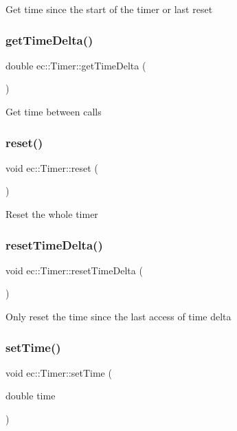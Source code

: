 Get time since the start of the timer or last reset \mbox{\label{classec_1_1_timer_a17b6b8d3cf83bb86df9164160b791016}} 
\subsubsection{\texorpdfstring{get\+Time\+Delta()}{getTimeDelta()}}
{\footnotesize\ttfamily double ec\+::\+Timer\+::get\+Time\+Delta (\begin{DoxyParamCaption}{ }\end{DoxyParamCaption})}

Get time between calls \mbox{\label{classec_1_1_timer_a0f712ea9fa17c4657a877b9322219aa3}} 
\subsubsection{\texorpdfstring{reset()}{reset()}}
{\footnotesize\ttfamily void ec\+::\+Timer\+::reset (\begin{DoxyParamCaption}{ }\end{DoxyParamCaption})}

Reset the whole timer \mbox{\label{classec_1_1_timer_a9c0d47620b70d0d7f392a9837601dad3}} 
\subsubsection{\texorpdfstring{reset\+Time\+Delta()}{resetTimeDelta()}}
{\footnotesize\ttfamily void ec\+::\+Timer\+::reset\+Time\+Delta (\begin{DoxyParamCaption}{ }\end{DoxyParamCaption})}

Only reset the time since the last access of time delta \mbox{\label{classec_1_1_timer_ab1731ad2f23bc4b37a6bc5b061846dd6}} 
\subsubsection{\texorpdfstring{set\+Time()}{setTime()}}
{\footnotesize\ttfamily void ec\+::\+Timer\+::set\+Time (\begin{DoxyParamCaption}\item[{double}]{time }\end{DoxyParamCaption})\hspace{0.3cm}{\ttfamily [static]}}


